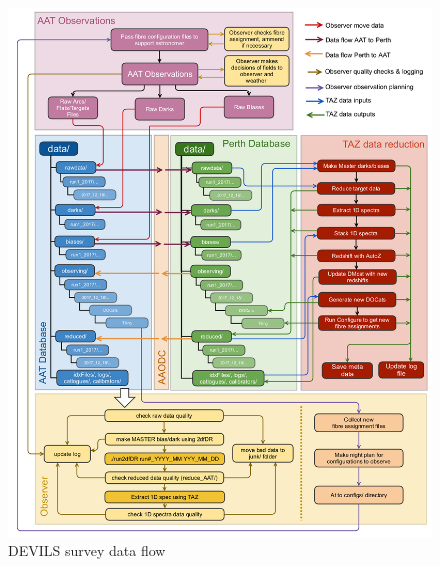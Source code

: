 \documentclass[12pt]{article}
\begin{document}
\begin{figure}
\begin{center}
\includegraphics[scale=0.17]{devils_taz_dataflow.png}
\caption{DEVILS survey data flow}
\label{fig:dataflow}
\end{center}
\end{figure}
\end{document}
